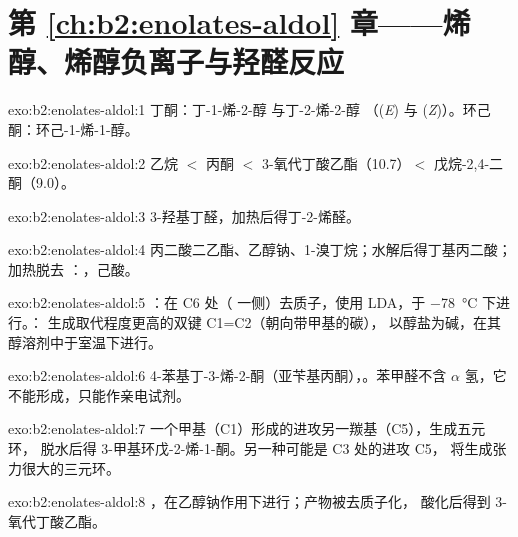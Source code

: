 \section*{第 \ref{ch:b2:enolates-aldol} 章——烯醇、烯醇负离子与羟醛反应}

\begin{solution}{exo:b2:enolates-aldol:1}
丁酮：丁-1-烯-2-醇  与丁-2-烯-2-醇 （(\textit{E}) 与
(\textit{Z})）。环己酮：环己-1-烯-1-醇。
\end{solution}

\begin{solution}{exo:b2:enolates-aldol:2}
乙烷 $<$ 丙酮 $<$ 3-氧代丁酸乙酯（10.7）$<$ 戊烷-2,4-二酮（9.0）。
\end{solution}

\begin{solution}{exo:b2:enolates-aldol:3}
3-羟基丁醛，加热后得丁-2-烯醛。
\end{solution}

\begin{solution}{exo:b2:enolates-aldol:4}
丙二酸二乙酯、乙醇钠、1-溴丁烷；水解后得丁基丙二酸；
加热脱去 ：，己酸。
\end{solution}

\begin{solution}{exo:b2:enolates-aldol:5}
：在 C6 处（ 一侧）去质子，使用 LDA，于 \qty{-78}{\degreeCelsius} 下进行。：
生成取代程度更高的双键 C1=C2（朝向带甲基的碳），
以醇盐为碱，在其醇溶剂中于室温下进行。
\end{solution}

\begin{solution}{exo:b2:enolates-aldol:6}
4-苯基丁-3-烯-2-酮（亚苄基丙酮），。苯甲醛不含 $\alpha$ 氢，它
不能形成，只能作亲电试剂。
\end{solution}

\begin{solution}{exo:b2:enolates-aldol:7}
一个甲基（C1）形成的进攻另一羰基（C5），生成五元环，
脱水后得 3-甲基环戊-2-烯-1-酮。另一种可能是 C3 处的进攻 C5，
将生成张力很大的三元环。
\end{solution}

\begin{solution}{exo:b2:enolates-aldol:8}
，在乙醇钠作用下进行；产物被去质子化，
酸化后得到 3-氧代丁酸乙酯。
\end{solution}

